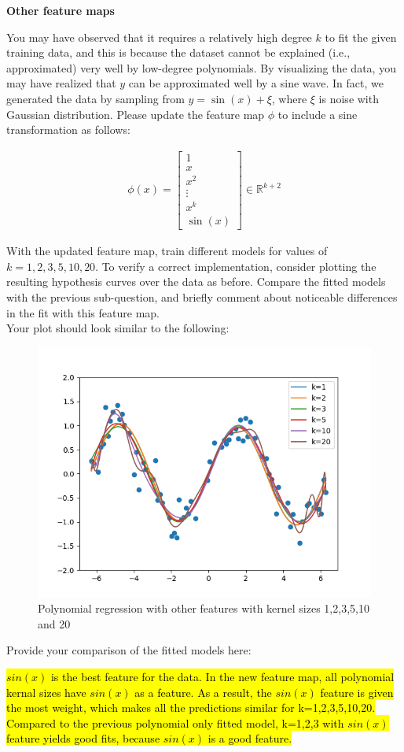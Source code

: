 \item {} {\bf Other feature maps}

You may have observed that it requires a relatively high degree $k$ to fit the given training data, and this is because the dataset cannot be explained (i.e., approximated) very well by low-degree polynomials. By visualizing the data, you may have realized that $y$ can be approximated well by a sine wave. In fact, we generated the data by sampling from $y = \sin(x) + \xi$, where $\xi$ is noise with Gaussian distribution. Please update the feature map $\phi$ to include a sine transformation as follows:

\begin{align}
\phi(x) = \left[\begin{array}{c} 1\\ x \\ x^2\\ \vdots \\x^k \\ \sin(x) \end{array}\right]\in \mathbb{R}^{k+2} \label{eqn:feature-sine}
\end{align}

With the updated feature map, train different models for values of $k=1,2,3,5,10,20$.  To verify a correct implementation, consider plotting the resulting hypothesis curves over the data as before. Compare the fitted models with the previous sub-question, and briefly comment about noticeable differences in the fit with this feature map.\\

Your plot should look similar to the following:
\begin{figure}[H]
  \centering
  \includegraphics[width=0.65\linewidth]{featuremaps/src/large-sine.png}
  \centering
\caption{Polynomial regression with other features with kernel sizes 1,2,3,5,10 and 20}
\end{figure}

Provide your comparison of the fitted models here:

\hl{$sin({x})$ is the best feature for the data. In the new feature map, all polynomial kernal sizes have $sin({x})$ as a feature. As a result, the $sin({x})$ feature is given the most weight, which makes all the predictions similar for k=1,2,3,5,10,20. Compared to the previous polynomial only fitted model, k=1,2,3 with $sin({x})$ feature yields good fits, because $sin({x})$ is a good feature.}
\\[50pt]